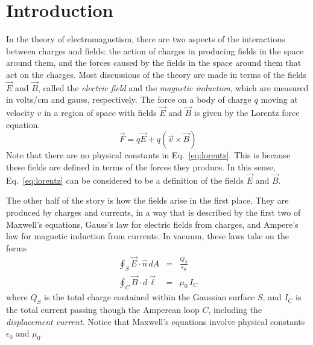 \documentclass{revtex4}
\begin{document}
%
%
%
%

\section{Introduction}

In the theory of electromagnetism, there are two aspects of the
interactions between charges and fields: the action of charges in
producing fields in the space around them, and the forces caused by
the fields in the space around them that act on the charges.  Most
discussions of the theory are made in terms of the fields $\vec{E}$
and $\vec{B}$, called the {\em electric field} and the {\em magnetic
induction}, which are measured in volts/cm and gauss, respectively.
The force on a body of charge $q$ moving at velocity $v$ in a region
of space with fields $\vec{E}$ and $\vec{B}$ is given by the Lorentz
force equation.
\begin{equation}
\vec{F} = q\vec{E} + q(\vec{v}\times\vec{B})
\label{eq:lorentz}
\end{equation}
Note that there are no physical constants in Eq.~\ref{eq:lorentz}.
This is because these fields are defined in terms of the forces they
produce.  In this sense, Eq.~\ref{eq:lorentz} can be considered to
be a definition of the fields $\vec{E}$ and $\vec{B}$.

The other half of the story is how the fields arise in the first place.
They are produced by charges and currents, in a way that is described
by the first two of Maxwell's equations, Gauss's law for electric fields
from charges, and Ampere's law for magnetic induction from currents.
In vacuum, these laws take on the forms
\begin{eqnarray}
\oint_S \vec{E}\cdot\hat{n}\,dA &=& \frac{Q_S}{\epsilon_0}
\label{eq:Gauss} \\
\oint_C \vec{B}\cdot d\vec{\ell} &=& \mu_0\, I_C
\label{eq:Amperes}
\end{eqnarray}
where $Q_S$ is the total charge contained within the Gaussian surface
$S$, and $I_C$ is the total current passing though the Amperean loop $C$,
including the {\em displacement current}.  Notice that Maxwell's equations
involve physical constants $\epsilon_0$ and $\mu_0$.
\end{document}
